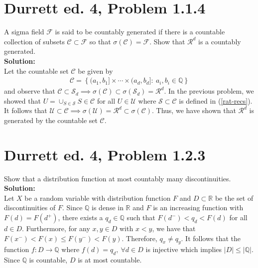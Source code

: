 \documentclass[12pt]{article}
\newcommand{\Sd}{\mathcal{S}_d}
\newcommand{\U}{\mathcal{U}}
\begin{document}
    \section*{Durrett ed. 4, Problem 1.1.4}
    A sigma field $\mathcal F$ is said to be countably generated if there is a countable collection of subsets $\mathscr C\subset \mathcal F$
    so that $\sigma(\mathscr C) = \mathcal F$. Show that $\mathcal R^d$ is a countably generated.\\

    \textbf{Solution:}\\
    Let the countable set $\mathscr C$ be given by
    \begin{align}
        \mathscr C = \left\{(a_1, b_1]\times\cdots\times(a_d, b_d]: \ a_i, b_i\in\mathbb Q\right\}
    \end{align}
    and observe that $\mathscr C\subset\Sd\implies\sigma(\mathscr C)\subset\sigma(\Sd) = \mathcal R^d$. In the previous problem, we showed that
    $U = \cup_{S\in\mathscr S}S\in\mathscr C$ for all $U\in\U$ where $\mathscr S\subset \mathscr C$ is defined in (\ref{rat-recs}). 
    It follows that $\U\subset\mathscr C\implies \sigma(\U) = \mathcal R^d \subset\sigma(\mathscr C)$.
    Thus, we have shown that $\mathcal R^d$ is generated by the countable set $\mathscr C$.

    \section*{Durrett ed. 4, Problem 1.2.3}
    Show that a distribution function at most countably many discontinuities.\\

    \textbf{Solution:}\\
    Let $X$ be a random variable with distribution function $F$ and $D\subset \mathbb R$ be the set of discontinuities of $F$.
    Since $\mathbb Q$ is dense in $\mathbb R$ and $F$ is an increasing function with $F(d) = F(d^+)$, there exists a $q_d\in\mathbb Q$ such that 
    $F(d^-) < q_d < F(d)$ for all $d\in D$. Furthermore, for any $x, y\in D$ with $x < y$, we have that $F(x^-) < F(x) \leq F(y^-) < F(y)$.
    Therefore, $q_x \neq q_y$. It follows that the function $f: D\to\mathbb Q$ where $f(d) = q_d, \ \forall d\in D$ is injective
    which implies $|D| \leq |\mathbb Q|$. Since $\mathbb Q$ is countable, $D$ is at most countable.
\end{document}
